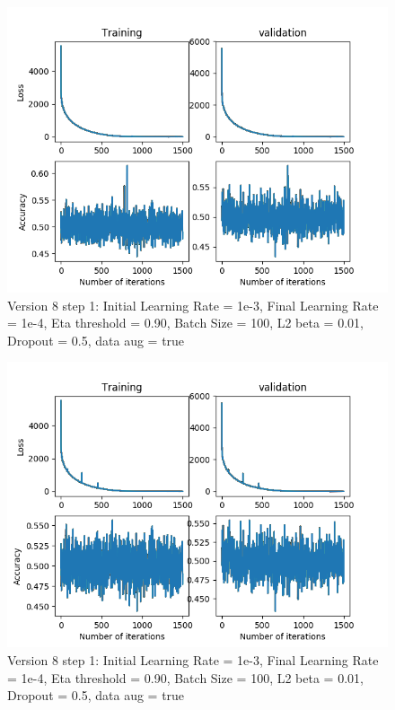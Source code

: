 \documentclass[12pt,reqno]{amsart}
\numberwithin{equation}{section}
\begin{document}
\begin{enumerate}
\begin{figure}[H]
\centering
\includegraphics[scale=0.6]{data_liquid25_version11_step1}
\caption{Version 8 step 1: Initial Learning Rate = 1e-3, Final Learning Rate = 1e-4, Eta threshold = 0.90, Batch Size = 100, L2 beta = 0.01, Dropout = 0.5, data aug = true}
\end{figure}

\begin{figure}[H]
\centering
\includegraphics[scale=0.6]{data_liquid25_version12_step1}
\caption{Version 8 step 1: Initial Learning Rate = 1e-3, Final Learning Rate = 1e-4, Eta threshold = 0.90, Batch Size = 100, L2 beta = 0.01, Dropout = 0.5, data aug = true}
\end{figure}


\end{enumerate}
\end{document}
